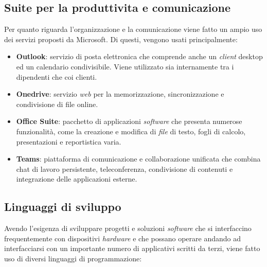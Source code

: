 \subsection{Suite per la produttivita e comunicazione}
Per quanto riguarda l'organizzazione e la comunicazione viene fatto un ampio uso dei servizi proposti da Microsoft. Di questi, vengono usati principalmente:
\begin{itemize}
    \item \textbf{Outlook}: servizio di posta elettronica che comprende anche un \emph{client} desktop ed un calendario condivisibile. 
    Viene utilizzato sia internamente tra i dipendenti che coi clienti.
    \item \textbf{Onedrive}: servizio \emph{web} per la memorizzazione, sincronizzazione e condivisione di file online.
    \item \textbf{Office Suite}: pacchetto di applicazioni \emph{software} che presenta numerose funzionalità, come la creazione e modifica di \emph{file} di testo, fogli di calcolo, presentazioni e reportistica varia.
    \item \textbf{Teams}: piattaforma di comunicazione e collaborazione unificata che combina chat di lavoro persistente, teleconferenza, condivisione di contenuti e integrazione delle applicazioni esterne.
\end{itemize}

\subsection{Linguaggi di sviluppo}

Avendo l'esigenza di sviluppare progetti e soluzioni \emph{software} che si interfaccino frequentemente con dispositivi \emph{hardware} e che possano operare andando ad interfacciarsi
con un importante numero di applicativi scritti da terzi, viene fatto uso di diversi linguaggi di programmazione:

